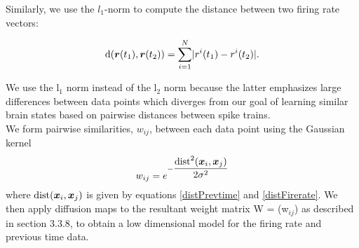 Similarly, we use the $l_{1}$-norm to compute the distance between two firing rate vectors:

\begin{equation}\label{distFirerate}
\text{d}(\boldsymbol{r}(t_{1}), \boldsymbol{r}(t_{2}) ) = 
\displaystyle \sum_{i=1}^{N} \lvert r^{i}(t_{1}) - r^{i}(t_{2})   \rvert.
\end{equation}

We use the  l$_1$ norm  instead of the l$_{2}$ norm because the latter emphasizes large differences between data points which diverges from our goal of learning similar brain states  based on pairwise distances between spike trains.\\


We form pairwise similarities, $w_{ij}$, between each data point
using the Gaussian kernel 
\[
w_{ij} = e^{-\dfrac{\text{dist}^{2}(\boldsymbol{x}_{i}, \boldsymbol{x}_{j})}{2\sigma^2}} 
\]
where $\text{dist}(\boldsymbol{x}_{i}, \boldsymbol{x}_{j})$ is given by equations
\eqref{distPrevtime} and \eqref{distFirerate}.
We then apply diffusion maps to the resultant weight matrix  W = (w$_{ij}$) 
as described in section 3.3.8, to obtain a low dimensional model for the 
firing rate and previous time data.



























